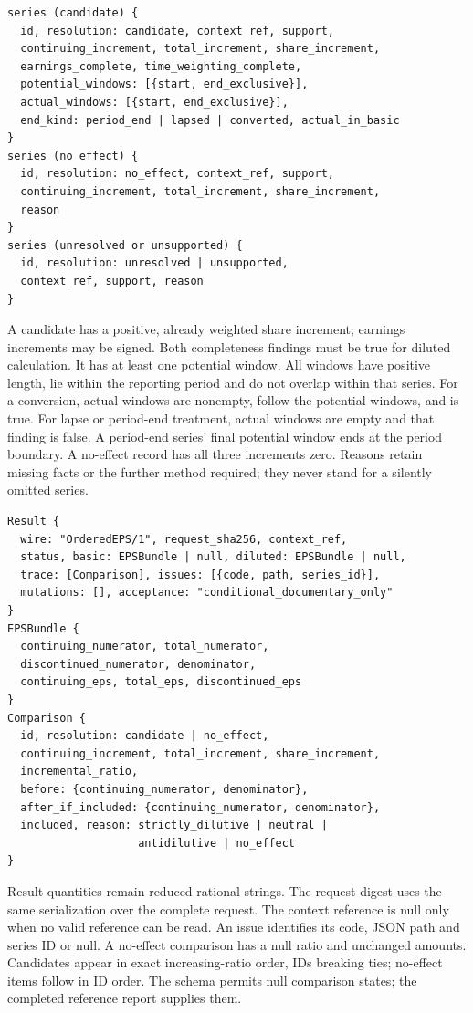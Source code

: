 \begin{lstlisting}
series (candidate) {
  id, resolution: candidate, context_ref, support,
  continuing_increment, total_increment, share_increment,
  earnings_complete, time_weighting_complete,
  potential_windows: [{start, end_exclusive}],
  actual_windows: [{start, end_exclusive}],
  end_kind: period_end | lapsed | converted, actual_in_basic
}
series (no effect) {
  id, resolution: no_effect, context_ref, support,
  continuing_increment, total_increment, share_increment,
  reason
}
series (unresolved or unsupported) {
  id, resolution: unresolved | unsupported,
  context_ref, support, reason
}
\end{lstlisting}

A candidate has a positive, already weighted share increment; earnings
increments may be signed. Both completeness findings must be true for diluted
calculation. It has at least one potential window. All windows have positive
length, lie within the reporting period and do not overlap within that series.
For a conversion, actual windows are nonempty, follow the potential windows,
and  is true. For lapse or period-end treatment, actual
windows are empty and that finding is false. A period-end series' final
potential window ends at the period boundary. A no-effect record has all three
increments zero. Reasons retain missing facts or the further method required;
they never stand for a silently omitted series.

\begin{lstlisting}
Result {
  wire: "OrderedEPS/1", request_sha256, context_ref,
  status, basic: EPSBundle | null, diluted: EPSBundle | null,
  trace: [Comparison], issues: [{code, path, series_id}],
  mutations: [], acceptance: "conditional_documentary_only"
}
EPSBundle {
  continuing_numerator, total_numerator,
  discontinued_numerator, denominator,
  continuing_eps, total_eps, discontinued_eps
}
Comparison {
  id, resolution: candidate | no_effect,
  continuing_increment, total_increment, share_increment,
  incremental_ratio,
  before: {continuing_numerator, denominator},
  after_if_included: {continuing_numerator, denominator},
  included, reason: strictly_dilutive | neutral |
                    antidilutive | no_effect
}
\end{lstlisting}

Result quantities remain reduced rational strings. The request digest uses
the same serialization over the complete request. The context reference is
null only when no valid reference can be read. An issue identifies its code,
JSON path and series ID or null. A no-effect comparison has a null ratio and
unchanged amounts. Candidates appear in exact increasing-ratio order, IDs
breaking ties; no-effect items follow in ID order. The schema permits null
comparison states; the completed reference report supplies them.

